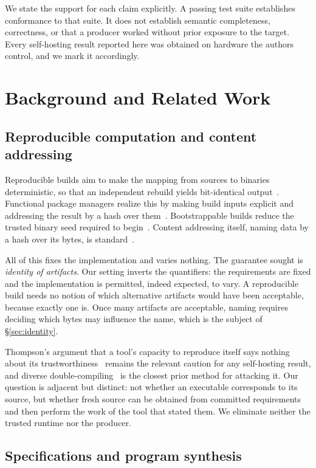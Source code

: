 \documentclass[10pt,twocolumn]{article}
\begin{document}
We state the support for each claim explicitly. A passing test suite
establishes conformance to that suite. It does not establish semantic
completeness, correctness, or that a producer worked without prior
exposure to the target. Every self-hosting result reported here was
obtained on hardware the authors control, and we mark it accordingly.

\section{Background and Related Work}
\label{sec:related}

\subsection{Reproducible computation and content addressing}

Reproducible builds aim to make the mapping from sources to binaries
deterministic, so that an independent rebuild yields bit-identical
output~\cite{lamb2022}. Functional package managers realize this by
making build inputs explicit and addressing the result by a hash over
them~\cite{dolstra2004,courtes2013}. Bootstrappable builds reduce the
trusted binary seed required to begin~\cite{bootstrappable}. Content
addressing itself, naming data by a hash over its bytes, is
standard~\cite{merkle1987,benet2014}.

All of this fixes the implementation and varies nothing. The guarantee
sought is \emph{identity of artifacts}. Our setting inverts the
quantifiers: the requirements are fixed and the implementation is
permitted, indeed expected, to vary. A reproducible build needs no notion
of which alternative artifacts would have been acceptable, because
exactly one is. Once many artifacts are acceptable, naming requires
deciding which bytes may influence the name, which is the subject of
\S\ref{sec:identity}.

Thompson's argument that a tool's capacity to reproduce itself says
nothing about its trustworthiness~\cite{thompson1984} remains the
relevant caution for any self-hosting result, and diverse
double-compiling~\cite{wheeler2009} is the closest prior method for
attacking it. Our question is adjacent but distinct: not whether an
executable corresponds to its source, but whether fresh source can be
obtained from committed requirements and then perform the work of the
tool that stated them. We eliminate neither the trusted runtime nor the
producer.

\subsection{Specifications and program synthesis}
\end{document}
